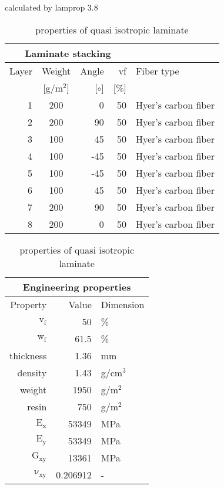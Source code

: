 \begin{table}[!htbp]
  \renewcommand{\arraystretch}{1.2}
  \caption{\label{tab:quasi isotropic laminate}properties of quasi isotropic laminate}
  \centering\footnotesize{\rule{0pt}{10pt}
  \tiny calculated by lamprop 3.8\\[3pt]}
    \begin{tabular}[t]{rcrrl}
      \multicolumn{4}{c}{\small\textbf{Laminate stacking}}\\[0.1em]
      \toprule %
      Layer & Weight & Angle & vf & Fiber type\\
            & [g/m$^2$] & [$\circ$] & [\%]\\
      \midrule
      1 &  200 &     0 & 50 & Hyer's carbon fiber\\
      2 &  200 &    90 & 50 & Hyer's carbon fiber\\
      3 &  100 &    45 & 50 & Hyer's carbon fiber\\
      4 &  100 &   -45 & 50 & Hyer's carbon fiber\\
      5 &  100 &   -45 & 50 & Hyer's carbon fiber\\
      6 &  100 &    45 & 50 & Hyer's carbon fiber\\
      7 &  200 &    90 & 50 & Hyer's carbon fiber\\
      8 &  200 &     0 & 50 & Hyer's carbon fiber\\
      \bottomrule
    \end{tabular}\hspace{0.02\textwidth}
    \begin{tabular}[t]{rrl}
      \multicolumn{3}{c}{\small\textbf{Engineering properties}}\\[0.1em]
      \toprule
      Property & Value & Dimension\\
      \midrule
      $\mathrm{v_f}$ & 50 &\%\\
      $\mathrm{w_f}$ & 61.5 &\%\\
      thickness & 1.36 & mm\\
      density & 1.43 & g/cm$^3$\\
      weight & 1950 & g/m$^2$\\
      resin & 750 & g/m$^2$\\
      \midrule
      $\mathrm{E_x}$ &    53349 & MPa\\
      $\mathrm{E_y}$ &    53349 & MPa\\
      $\mathrm{G_{xy}}$ &    13361 & MPa\\
      $\mathrm{\nu_{xy}}$ & 0.206912 &-\\

\end{tabular}
\end{table}
